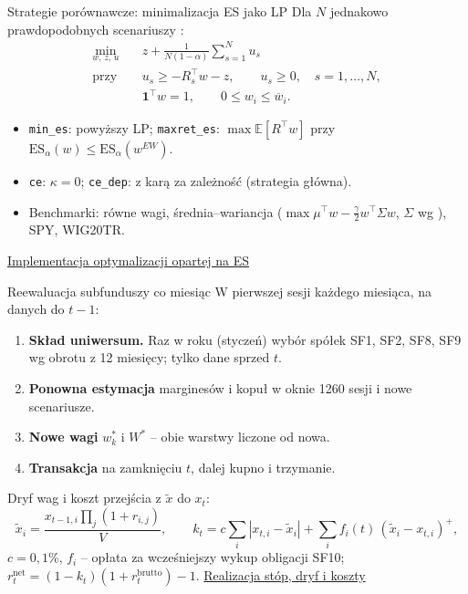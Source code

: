 \documentclass[aspectratio=169,11pt]{beamer}
\newcommand{\repo}{https://github.com/michalmarchwiak/bsc-project}
\newcommand{\rev}{9e941db56fde866672b262f5f6725268ce58feb7}
\newcommand{\src}[2]{\vfill{\scriptsize\color{Teal}%
  \href{\repo/blob/\rev/#1}{#2}}}
\newcommand{\E}{\mathbb{E}}
\begin{document}
\begin{frame}{Strategie porównawcze: minimalizacja ES jako LP}
  Dla \(N\) jednakowo prawdopodobnych scenariuszy \citep{rockafellar2000}:
  \[
    \begin{aligned}
      \min_{w,\,z,\,u}\quad &
        z+\frac{1}{N(1-\alpha)}\sum_{s=1}^{N}u_s\\
      \text{przy}\quad &
        u_s\ge -R_s^\top w-z,\qquad u_s\ge 0,\quad s=1,\dots,N,\\
      & \mathbf{1}^\top w=1,\qquad 0\le w_i\le \overline w_i.
    \end{aligned}
  \]
  \begin{itemize}
    \item \texttt{min\_es}: powyższy LP; \texttt{maxret\_es}:
      \(\max \E[R^\top w]\) przy \(\mathrm{ES}_\alpha(w)\le\mathrm{ES}_\alpha(w^{EW})\).
    \item \texttt{ce}: \(\kappa=0\); \texttt{ce\_dep}: z karą
      za zależność (strategia główna).
    \item Benchmarki: równe wagi, średnia--wariancja
      (\(\max\mu^\top w-\tfrac\gamma2 w^\top\Sigma w\), \(\Sigma\) wg \citealp{ledoit2004}),
      SPY, WIG20TR.
  \end{itemize}
  \src{src/pf/opt/cvar.py}{Implementacja optymalizacji opartej na ES}
\end{frame}

\begin{frame}{Reewaluacja subfunduszy co miesiąc}
  W pierwszej sesji każdego miesiąca, na danych do \(t-1\):
  \begin{enumerate}
    \item \textbf{Skład uniwersum.} Raz w roku (styczeń) wybór spółek
      SF1, SF2, SF8, SF9 wg obrotu z 12 miesięcy; tylko dane sprzed \(t\).
    \item \textbf{Ponowna estymacja} marginesów i kopuł w oknie 1260 sesji
      i nowe scenariusze.
    \item \textbf{Nowe wagi} \(w_k^*\) i \(W^*\) -- obie warstwy liczone od nowa.
    \item \textbf{Transakcja} na zamknięciu \(t\), dalej kupno i trzymanie.
  \end{enumerate}
  Dryf wag i koszt przejścia z \(\tilde x\) do \(x_t\):
  \[
    \tilde x_{i}=\frac{x_{t-1,i}\prod_j(1+r_{i,j})}{V},\qquad
    k_t=c\sum_i|x_{t,i}-\tilde x_i|+\sum_i f_i(t)\,(\tilde x_i-x_{t,i})^+,
  \]
  \(c=0{,}1\%\), \(f_i\) -- opłata za wcześniejszy wykup obligacji SF10;
  \(r^{\text{net}}_t=(1-k_t)(1+r^{\text{brutto}}_t)-1\).
  \src{src/pf/backtest/realized.py}{Realizacja stóp, dryf i koszty}
\end{frame}
\end{document}
